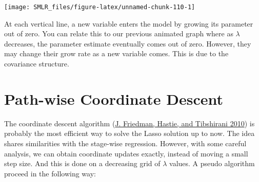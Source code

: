 \documentclass[
]{book}
\newenvironment{Shaded}{\begin{snugshade}}{\end{snugshade}}
\newcommand{\AttributeTok}[1]{\textcolor[rgb]{0.13,0.29,0.53}{#1}}
\newcommand{\DecValTok}[1]{\textcolor[rgb]{0.00,0.00,0.81}{#1}}
\newcommand{\FunctionTok}[1]{\textcolor[rgb]{0.13,0.29,0.53}{\textbf{#1}}}
\newcommand{\NormalTok}[1]{#1}
\newcommand{\OtherTok}[1]{\textcolor[rgb]{0.56,0.35,0.01}{#1}}
\newcommand{\SpecialCharTok}[1]{\textcolor[rgb]{0.81,0.36,0.00}{\textbf{#1}}}
\newcommand{\StringTok}[1]{\textcolor[rgb]{0.31,0.60,0.02}{#1}}
\theoremstyle{definition}
\theoremstyle{definition}
\theoremstyle{definition}
\theoremstyle{definition}
\theoremstyle{remark}
\begin{document}
\begin{Shaded}
\end{Shaded}

\begin{center}\texttt{[image: SMLR\_files/figure-latex/unnamed-chunk-110-1]} \end{center}

At each vertical line, a new variable enters the model by growing its parameter out of zero. You can relate this to our previous animated graph where as \(\lambda\) decreases, the parameter estimate eventually comes out of zero. However, they may change their grow rate as a new variable comes. This is due to the covariance structure.

\hypertarget{path-wise-coordinate-descent}{%
\section{Path-wise Coordinate Descent}\label{path-wise-coordinate-descent}}

The coordinate descent algorithm (\protect\hyperlink{ref-friedman2010regularization}{J. Friedman, Hastie, and Tibshirani 2010}) is probably the most efficient way to solve the Lasso solution up to now. The idea shares similarities with the stage-wise regression. However, with some careful analysis, we can obtain coordinate updates exactly, instead of moving a small step size. And this is done on a decreasing grid of \(\lambda\) values. A pseudo algorithm proceed in the following way:
\end{document}
